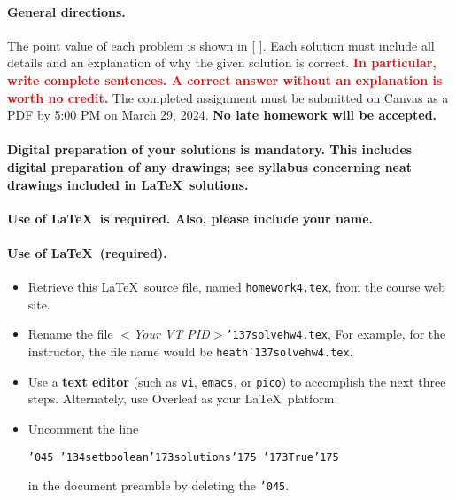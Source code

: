 \documentclass[11pt,twoside]{article}
\newcommand{\mybackslash}{\char'134}
\newcommand{\myleftbracket}{\char'173}
\newcommand{\myrightbracket}{\char'175}
\newcommand{\mypercent}{\char'045}
\newcommand{\myunderscore}{\char'137}
\newcommand{\duedate}{March 29, 2024}
\newcommand{\homeworknumber}{4}
\newcounter{problem}
\begin{document}
{
\begingroup %
\paragraph{General directions.}
The point value of each problem is shown in [ ].
Each solution must include all details and
an explanation of why the given solution is correct.
\textbf{\textcolor{red}{In particular,
write complete sentences.
A correct answer without an explanation is worth no credit.}}
The completed assignment must be submitted on Canvas as a PDF by 5:00 PM
on \duedate.
\textbf{No late homework will be accepted.}

\paragraph{Digital preparation of your solutions is mandatory.
This includes digital preparation of any drawings; see syllabus
concerning neat drawings included in \LaTeX\ solutions.}
\textbf{Use of \LaTeX\ is required.
Also,
please include your name.}

\paragraph{Use of \LaTeX\ (required).}
\begin{itemize}
\item Retrieve this \LaTeX\ source file,
named
\texttt{homework\homeworknumber.tex},
from the course web site.
\item Rename the file
\textit{$<$Your VT PID$>$}\texttt{{\myunderscore}solvehw\homeworknumber.tex},
For example,
for the instructor,
the file name would be
\texttt{heath{\myunderscore}solvehw\homeworknumber.tex}.

\item
Use a \textbf{text editor}
(such as \texttt{vi}, \texttt{emacs}, or \texttt{pico})
to accomplish the next three steps.
Alternately,
use Overleaf as your \LaTeX\ platform.

\item
Uncomment the line

\texttt{{\mypercent} 
{\mybackslash}setboolean{\myleftbracket}solutions{\myrightbracket}%
{\myleftbracket}True{\myrightbracket}}

in the document preamble by deleting the \texttt{\mypercent}.


\end{itemize}}
\end{document}
